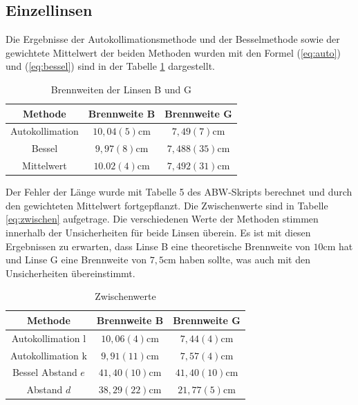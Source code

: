 \documentclass[11pt, a4paper]{article}
\begin{document}
    \subsection{Einzellinsen}
    Die Ergebnisse der Autokollimationsmethode und der Besselmethode sowie der gewichtete Mittelwert der beiden Methoden wurden mit den Formel (\ref{eq:auto}) und (\ref{eq:bessel}) sind in der Tabelle \ref{tab:ergebnisse} dargestellt.

    \begin{table}[h]
        \centering
        \begin{tabular}{c|c|c}
            Methode & Brennweite B & Brennweite G \\ \hline
            Autokollimation & $10,04(5) \si{\centi\metre}$ & $7,49(7) \si{\centi\metre}$ \\ \hline
            Bessel & $9,97(8) \si{\centi\metre}$ & $7,488(35) \si{\centi\metre}$ \\ \hline
            Mittelwert & $10.02(4) \si{\centi\metre}$ & $7,492(31) \si{\centi\metre}$
        \end{tabular}
        \caption{Brennweiten der Linsen B und G}
        \label{tab:ergebnisse}
    \end{table}
    Der Fehler der Länge wurde mit Tabelle 5 des ABW-Skripts \cite{ABW} berechnet und durch den gewichteten Mittelwert fortgepflanzt. Die Zwischenwerte sind in Tabelle \ref{eq:zwischen} aufgetrage. Die verschiedenen Werte der Methoden stimmen innerhalb der Unsicherheiten für beide Linsen überein. Es ist mit diesen Ergebnissen zu erwarten, dass Linse B eine theoretische Brennweite von $10 \si{\centi\metre}$ hat und Linse G eine Brennweite von $7,5 \si{\centi\metre}$ haben sollte, was auch mit den Unsicherheiten übereinstimmt.

    \begin{table}[h]
        \centering
        \begin{tabular}{c|c|c}
            Methode & Brennweite B & Brennweite G \\ \hline
            Autokollimation l & $10,06(4) \si{\centi\metre}$ & $7,44(4) \si{\centi\metre}$ \\ \hline
            Autokollimation k & $9,91(11) \si{\centi\metre}$ & $7,57(4) \si{\centi\metre}$ \\ \hline
            Bessel Abstand $e$ & $41,40(10) \si{\centi\metre}$ & $41,40(10) \si{\centi\metre}$ \\ \hline
            Abstand $d$ & $38,29(22) \si{\centi\metre}$ & $21,77(5) \si{\centi\metre}$
        \end{tabular}
        \caption{Zwischenwerte }
        \label{tab:zwischen}
    \end{table}
\end{document}
